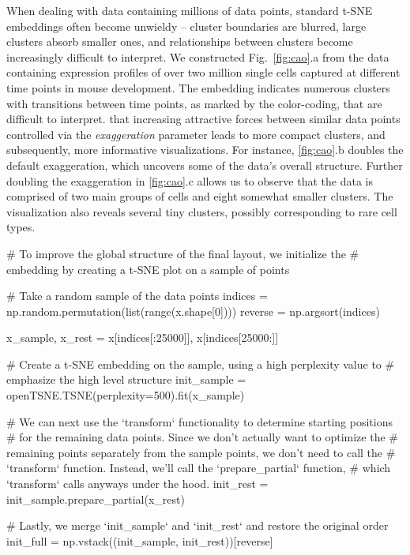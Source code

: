 \documentclass[article]{jss}
\begin{document}
When dealing with data containing millions of data points, standard t-SNE
embeddings often become unwieldy -- cluster boundaries are blurred, large
clusters absorb smaller ones, and relationships between clusters become
increasingly difficult to interpret. We constructed Fig.~\ref{fig:cao}.a from
the data containing expression profiles of over two million single cells
captured at different time points in mouse development. The embedding indicates
numerous clusters with transitions between time points, as marked by the
color-coding, that are difficult to interpret. \citet{kobak2019art} that
increasing attractive forces between similar data points controlled via
the \textit{exaggeration} parameter leads to more compact clusters, and
subsequently, more informative visualizations. For instance, \ref{fig:cao}.b
doubles the default exaggeration, which uncovers some
of the data's overall structure. Further doubling the exaggeration in
\ref{fig:cao}.c allows us to observe that the data is comprised of two main groups
of cells and eight somewhat smaller clusters. The visualization also reveals
several tiny clusters, possibly corresponding to rare cell types.
\begin{CodeChunk}
\begin{CodeInput}
# To improve the global structure of the final layout, we initialize the
# embedding by creating a t-SNE plot on a sample of points

# Take a random sample of the data points
indices = np.random.permutation(list(range(x.shape[0])))
reverse = np.argsort(indices)

x_sample, x_rest = x[indices[:25000]], x[indices[25000:]]

# Create a t-SNE embedding on the sample, using a high perplexity value to
# emphasize the high level structure
init_sample = openTSNE.TSNE(perplexity=500).fit(x_sample)

# We can next use the `transform` functionality to determine starting positions
# for the remaining data points. Since we don't actually want to optimize the
# remaining points separately from the sample points, we don't need to call the
# `transform` function. Instead, we'll call the `prepare_partial` function,
# which `transform` calls anyways under the hood.
init_rest = init_sample.prepare_partial(x_rest)

# Lastly, we merge `init_sample` and `init_rest` and restore the original order
init_full = np.vstack((init_sample, init_rest))[reverse]
\end{CodeInput}
\end{CodeChunk}
\end{document}

